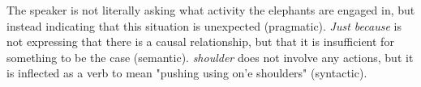 \documentclass{article}
\begin{document}
The speaker is not literally asking what activity the elephants are engaged in, but instead indicating that this situation is unexpected (pragmatic).
\textit{Just because} is not expressing that there is a causal relationship, but that it is insufficient for something to be the case (semantic).
\textit{shoulder} does not involve any actions, but it is inflected as a verb to mean "pushing using on'e shoulders" (syntactic).
\end{document}
